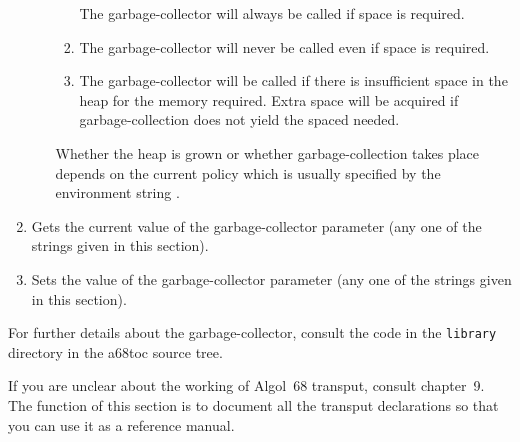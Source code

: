 \begin{enumerate}
\begin{enumerate}
\begin{enumerate}
The garbage-collector will always be called if space is required.
\item {}\newline
The garbage-collector will never be called even if space is required.
\item {}\newline
The garbage-collector will be called if there is insufficient space
in the heap for the memory required. Extra space will be acquired if
garbage-collection does not yield the spaced needed.
\end{enumerate}
Whether the heap is grown or whether garbage-collection takes place
depends on the current policy which is usually specified by the
environment string .
\end{enumerate}
\item {}\newline
Gets the current value of the garbage-collector parameter (any one of
the strings given in this section).
\item {}\newline
Sets the value of the garbage-collector parameter (any one of the
strings given in this section).
\end{enumerate}

For further details about the garbage-collector, consult the code in
the \verb|library| directory in the a68toc source tree.

If you are unclear about the working of Algol~68 transput, consult
chapter~9. The function of this section is to document all the transput
declarations so that you can use it as a reference manual.

